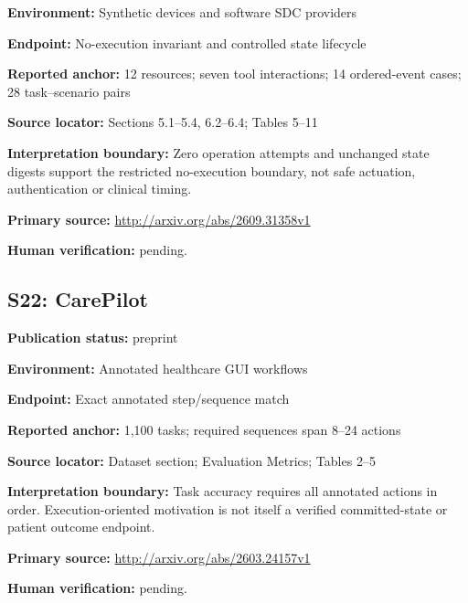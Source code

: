 \documentclass[journal,onecolumn,10pt]{IEEEtran}
\begin{document}
\noindent\textbf{Environment:} Synthetic devices and software SDC providers\par

\noindent\textbf{Endpoint:} No-execution invariant and controlled state lifecycle\par

\noindent\textbf{Reported anchor:} 12 resources; seven tool interactions; 14 ordered-event cases; 28 task–scenario pairs\par

\noindent\textbf{Source locator:} Sections 5.1–5.4, 6.2–6.4; Tables 5–11\par

\noindent\textbf{Interpretation boundary:} Zero operation attempts and unchanged state digests support the restricted no-execution boundary, not safe actuation, authentication or clinical timing.\par

\noindent\textbf{Primary source:} \url{http://arxiv.org/abs/2609.31358v1}\par
\noindent\textbf{Human verification:} pending.

\subsection*{S22: CarePilot}

\noindent\textbf{Publication status:} preprint\par

\noindent\textbf{Environment:} Annotated healthcare GUI workflows\par

\noindent\textbf{Endpoint:} Exact annotated step/sequence match\par

\noindent\textbf{Reported anchor:} 1,100 tasks; required sequences span 8–24 actions\par

\noindent\textbf{Source locator:} Dataset section; Evaluation Metrics; Tables 2–5\par

\noindent\textbf{Interpretation boundary:} Task accuracy requires all annotated actions in order. Execution-oriented motivation is not itself a verified committed-state or patient outcome endpoint.\par

\noindent\textbf{Primary source:} \url{http://arxiv.org/abs/2603.24157v1}\par
\noindent\textbf{Human verification:} pending.
\end{document}
